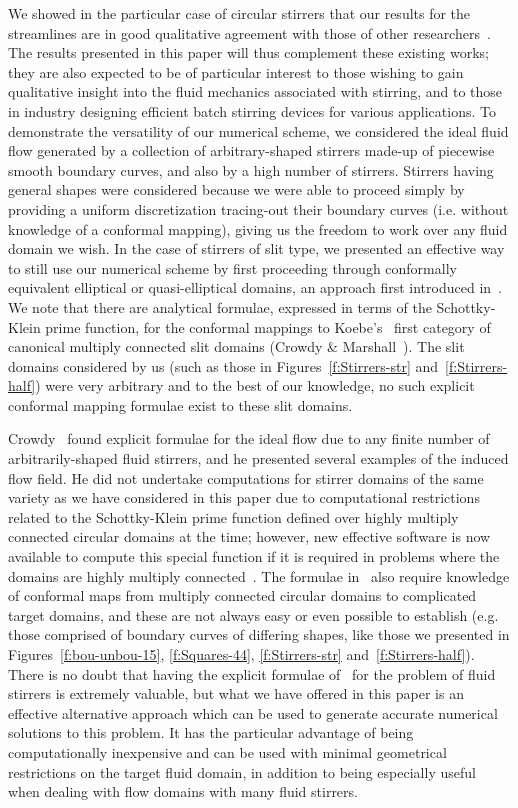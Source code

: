 \documentclass[11pt,a4paper]{article}
\begin{document}
We showed in the particular case of circular stirrers that our results
for the streamlines are in good qualitative agreement with those of
other researchers~\cite{cro-str,fin}. The results presented in this 
paper will thus complement these existing works; they are also expected to be of
particular interest to those wishing to gain qualitative insight into
the fluid mechanics associated with stirring, and to those in industry
designing efficient batch stirring devices for various applications.
To demonstrate the versatility of our numerical scheme, we considered
the ideal fluid flow generated by a collection of arbitrary-shaped
stirrers made-up of piecewise smooth boundary curves, and also by a
high number of stirrers. Stirrers having general shapes were
considered because we were able to proceed simply by providing a
uniform discretization tracing-out their boundary curves (i.e. without
knowledge of a conformal mapping), giving us the freedom to work over
any fluid domain we wish. In the case of stirrers of slit type, we
presented an effective way to still use our numerical scheme by first
proceeding through conformally equivalent elliptical or
quasi-elliptical domains, an approach first introduced 
in~\cite{Aoy-Sak-Tan13}. We note
that there are analytical formulae, expressed in terms of the
Schottky-Klein prime function, for the conformal mappings to Koebe's~\cite{Koe18}
first category
of canonical multiply connected slit domains (Crowdy \&
Marshall~\cite{cro-mar}). The slit domains considered by us (such as those in
Figures~\ref{f:Stirrers-str} and~\ref{f:Stirrers-half}) 
were very arbitrary and to the best of our knowledge, no such 
explicit conformal mapping formulae exist to these slit domains.

Crowdy~\cite{cro-str} found explicit formulae for the ideal flow due to any
finite number of arbitrarily-shaped fluid stirrers, and he presented
several examples of the induced flow field. He did not undertake
computations for stirrer domains of the same variety as we have
considered in this paper due to computational restrictions related to
the Schottky-Klein prime function defined over highly multiply
connected circular domains at the time; however, new effective software is now
available to compute this special function if it is required in problems where the domains are highly multiply connected~\cite{skpf}. The formulae in~\cite{cro-str} also require knowledge of conformal
maps from multiply connected circular domains to complicated target domains, and these are not always easy or even possible to establish (e.g. those
comprised of boundary curves of differing shapes, like those we
presented in Figures~\ref{f:bou-unbou-15}, \ref{f:Squares-44}, \ref{f:Stirrers-str} and~\ref{f:Stirrers-half}). 
There is no doubt that having the
explicit formulae of~\cite{cro-str} for the problem of fluid stirrers is extremely
valuable, but what we have offered in this paper is an effective
alternative approach which can be used to generate accurate numerical
solutions to this problem. It has the particular advantage of being computationally inexpensive and can be used with minimal geometrical restrictions on the target fluid domain, in
addition to being especially useful when dealing with flow domains with many fluid stirrers.
\end{document}
